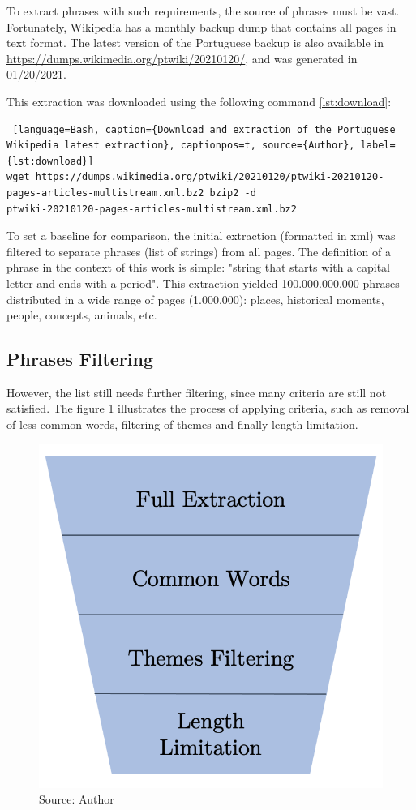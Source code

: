 To extract phrases with such requirements, the source of phrases must be vast. Fortunately, Wikipedia has a monthly backup dump that contains all pages in text format. The latest version of the Portuguese backup is also available in \url{https://dumps.wikimedia.org/ptwiki/20210120/}, and was generated in 01/20/2021.

This extraction was downloaded using the following command \ref{lst:download}:

\begin{lstlisting} [language=Bash, caption={Download and extraction of the Portuguese Wikipedia latest extraction}, captionpos=t, source={Author}, label={lst:download}]
wget https://dumps.wikimedia.org/ptwiki/20210120/ptwiki-20210120-pages-articles-multistream.xml.bz2 bzip2 -d
ptwiki-20210120-pages-articles-multistream.xml.bz2
\end{lstlisting}

To set a baseline for comparison, the initial extraction (formatted in xml) was filtered to separate phrases (list of strings) from all pages. The definition of a phrase in the context of this work is simple: "string that starts with a capital letter and ends with a period". This extraction yielded 100.000.000.000 phrases distributed in a wide range of pages (1.000.000): places, historical moments, people, concepts, animals, etc.

\subsection{Phrases Filtering}

However, the list still needs further filtering, since many criteria are still not satisfied. The figure \ref{fig:phrase-selection-pyramid} illustrates the process of applying criteria, such as removal of less common words, filtering of themes and finally length limitation.

\begin{figure}[h]
    \centering
    \caption{Filtering process for obtaining phrases for the Fale Alguma Coisa WebApp}
    \includegraphics[width=0.5\linewidth]{images/phrase-selection/filtering-pyramid.png}
    \caption*{Source: Author}
    \label{fig:phrase-selection-pyramid}
\end{figure}

